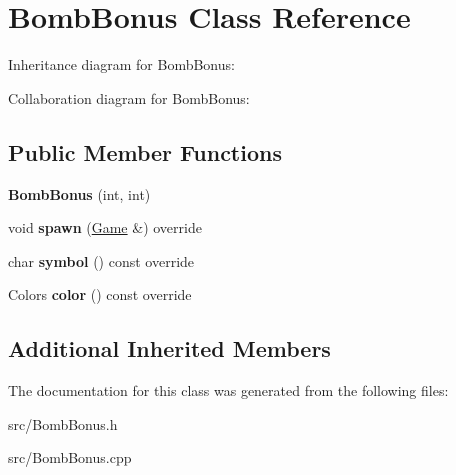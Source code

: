 \hypertarget{class_bomb_bonus}{}\section{Bomb\+Bonus Class Reference}
\label{class_bomb_bonus}


Inheritance diagram for Bomb\+Bonus\+:


Collaboration diagram for Bomb\+Bonus\+:
\subsection*{Public Member Functions}
\begin{DoxyCompactItemize}
\item 
\mbox{\label{class_bomb_bonus_ad6ec2fff12494d99ebb04b2b62582a74}} 
{\bfseries Bomb\+Bonus} (int, int)
\item 
\mbox{\label{class_bomb_bonus_a9c0bc861a08176319a2f845124d5b84f}} 
void {\bfseries spawn} (\mbox{\hyperlink{class_game}{Game}} \&) override
\item 
\mbox{\label{class_bomb_bonus_ad076cc4d58478fc98bb30ab89392101a}} 
char {\bfseries symbol} () const override
\item 
\mbox{\label{class_bomb_bonus_a33361d3ea7c27aa7009e5b2f1c3a02f0}} 
Colors {\bfseries color} () const override
\end{DoxyCompactItemize}
\subsection*{Additional Inherited Members}


The documentation for this class was generated from the following files\+:\begin{DoxyCompactItemize}
\item 
src/Bomb\+Bonus.\+h\item 
src/Bomb\+Bonus.\+cpp\end{DoxyCompactItemize}
